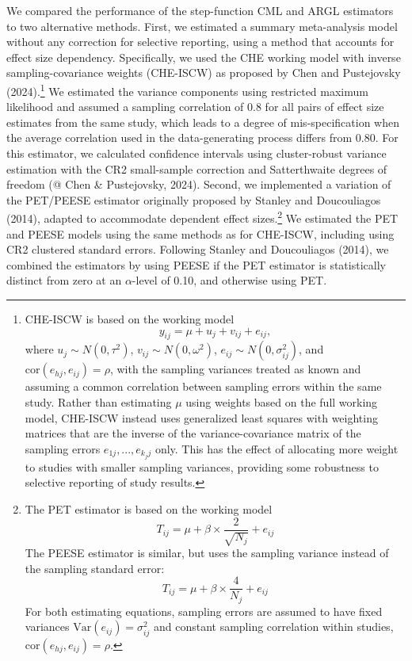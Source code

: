 \documentclass[
  american,
  man, donotrepeattitle,floatsintext]{apa7}
\begin{document}
We compared the performance of the step-function CML and ARGL estimators to two alternative methods.
First, we estimated a summary meta-analysis model without any correction for selective reporting, using a method that accounts for effect size dependency.
Specifically, we used the CHE working model with inverse sampling-covariance weights (CHE-ISCW) as proposed by Chen and Pustejovsky (2024).\footnote{CHE-ISCW is based on the working model
  \begin{equation}
    \label{eq:che}
    y_{ij} = \mu + u_j + v_{ij} + e_{ij},
    \end{equation}
  where \(u_j \sim N(0, \tau^2)\), \(v_{ij} \sim N(0, \omega^2)\), \(e_{ij} \sim N(0, \sigma_{ij}^2)\), and \(\text{cor}(e_{hj},e_{ij}) = \rho\), with the sampling variances treated as known and assuming a common correlation between sampling errors within the same study.
  Rather than estimating \(\mu\) using weights based on the full working model, CHE-ISCW instead uses generalized least squares with weighting matrices that are the inverse of the variance-covariance matrix of the sampling errors \(e_{1j},...,e_{k_j j}\) only.
  This has the effect of allocating more weight to studies with smaller sampling variances, providing some robustness to selective reporting of study results.}
We estimated the variance components using restricted maximum likelihood and assumed a sampling correlation of 0.8 for all pairs of effect size estimates from the same study, which leads to a degree of mis-specification when the average correlation used in the data-generating process differs from 0.80.
For this estimator, we calculated confidence intervals using cluster-robust variance estimation with the CR2 small-sample correction and Satterthwaite degrees of freedom (@ Chen \& Pustejovsky, 2024).
Second, we implemented a variation of the PET/PEESE estimator originally proposed by Stanley and Doucouliagos (2014), adapted to accommodate dependent effect sizes.\footnote{The PET estimator is based on the working model \begin{equation}
    \label{eq:pet}
    T_{ij} = \mu + \beta \times \frac{2}{\sqrt{N_j}} + e_{ij}
    \end{equation}
  The PEESE estimator is similar, but uses the sampling variance instead of the sampling standard error: \begin{equation}
    \label{eq:peese}
    T_{ij} = \mu + \beta \times \frac{4}{N_j} + e_{ij}
    \end{equation}
  For both estimating equations, sampling errors are assumed to have fixed variances
  \(\text{Var}(e_{ij}) = \sigma_{ij}^2\) and constant sampling correlation within studies, \(\text{cor}(e_{hj},e_{ij} )=\rho\).}
We estimated the PET and PEESE models using the same methods as for CHE-ISCW, including using CR2 clustered standard errors.
Following Stanley and Doucouliagos (2014), we combined the estimators by using PEESE if the PET estimator is statistically distinct from zero at an \(\alpha\)-level of 0.10, and otherwise using PET.
\end{document}
